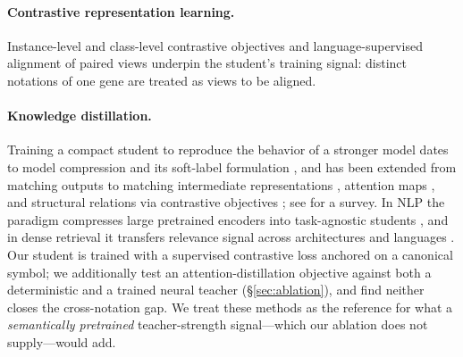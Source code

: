\documentclass[11pt]{article}
\begin{document}
\paragraph{Contrastive representation learning.} Instance-level and class-level
contrastive objectives \citep{simclr, supcon} and language-supervised alignment of
paired views \citep{clip} underpin the student's training signal: distinct
notations of one gene are treated as views to be aligned.
\paragraph{Knowledge distillation.} Training a compact student to reproduce the
behavior of a stronger model dates to model compression \citep{bucila2006} and its
soft-label formulation \citep{hinton2015distilling}, and has been extended from
matching outputs to matching intermediate representations
\citep{ba2014deep, romero2015fitnets}, attention maps \citep{zagoruyko2017attention},
and structural relations via contrastive objectives \citep{tian2020crd}; see
\citet{gou2021survey} for a survey. In NLP the paradigm compresses large
pretrained encoders into task-agnostic students \citep{sanh2019distilbert,
jiao2020tinybert, wang2020minilm}, and in dense retrieval it transfers relevance
signal across architectures \citep{hofstatter2020improving} and languages
\citep{reimers2020multilingual}. Our student is trained with a supervised
contrastive loss anchored on a canonical symbol; we additionally test an
attention-distillation objective \citep{zagoruyko2017attention} against both a
deterministic and a trained neural teacher (\S\ref{sec:ablation}), and find neither
closes the cross-notation gap. We treat these methods as the reference for what a
\emph{semantically pretrained} teacher-strength signal---which our ablation does not
supply---would add.
\end{document}
